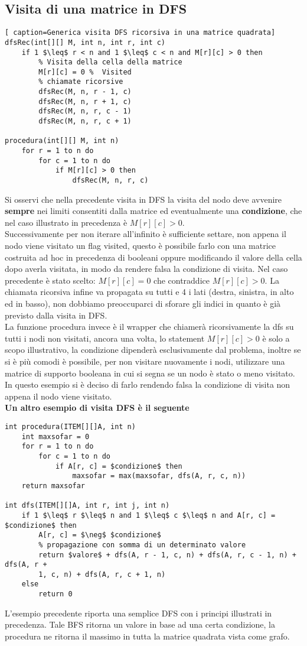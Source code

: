 \documentclass[../cheatSheetAlgoritmi.tex]{subfiles}
\begin{document}
\subsection{Visita di una matrice in DFS}
\begin{lstlisting}[ caption=Generica visita DFS ricorsiva in una matrice quadrata]
dfsRec(int[][] M, int n, int r, int c)
	if 1 $\leq$ r < n and 1 $\leq$ c < n and M[r][c] > 0 then
    	% Visita della cella della matrice
    	M[r][c] = 0	%  Visited
    	% chiamate ricorsive
    	dfsRec(M, n, r - 1, c)
    	dfsRec(M, n, r + 1, c)
    	dfsRec(M, n, r, c - 1)
    	dfsRec(M, n, r, c + 1)

procedura(int[][] M, int n)
	for r = 1 to n do
    	for c = 1 to n do
      		if M[r][c] > 0 then
        		dfsRec(M, n, r, c)
\end{lstlisting}
Si osservi che nella precedente visita in DFS la visita del nodo deve avvenire \textbf{sempre} nei limiti consentiti dalla matrice ed eventualmente una \textbf{condizione}, che nel caso illustrato in precedenza è $M[r][c] > 0$. \\
Successivamente per non iterare all'infinito è sufficiente settare, non appena il nodo viene visitato un flag visited, questo è possibile farlo con una matrice costruita ad hoc in precedenza di booleani oppure modificando il valore della cella dopo averla visitata, in modo da rendere falsa la condizione di visita. Nel caso precedente è stato scelto: $M[r][c] = 0$ che contraddice $M[r][c] > 0$. La chiamata ricorsiva infine va propagata su tutti e 4 i lati (destra, sinistra, in alto ed in basso), non dobbiamo preoccuparci di sforare gli indici in quanto è già previsto dalla visita in DFS.\\
La funzione procedura invece è il wrapper che chiamerà ricorsivamente la dfs su tutti i nodi non visitati, ancora una volta, lo statement $M[r][c] > 0$ è solo a scopo illustrativo, la condizione dipenderà esclusivamente dal problema, inoltre se si è più comodi è possibile, per non visitare nuovamente i nodi, utilizzare una matrice di supporto booleana in cui si segna se un nodo è stato o meno visitato. In questo esempio si è deciso di farlo rendendo falsa la condizione di visita non appena il nodo viene visitato.\\
\textbf{Un altro esempio di visita DFS è il seguente}
\begin{lstlisting}[caption=DFS generica con return di valore]
% esempio tenere il valore massimo
int procedura(ITEM[][]A, int n)
	int maxsofar = 0
  	for r = 1 to n do
    	for c = 1 to n do
      		if A[r, c] = $condizione$ then
       	 		maxsofar = max(maxsofar, dfs(A, r, c, n))
  	return maxsofar

int dfs(ITEM[][]A, int r, int j, int n)
	if 1 $\leq$ r $\leq$ n and 1 $\leq$ c $\leq$ n and A[r, c] = $condizione$ then
    	A[r, c] = $\neg$ $condizione$
    	% propagazione con somma di un determinato valore
    	return $valore$ + dfs(A, r - 1, c, n) + dfs(A, r, c - 1, n) + dfs(A, r +
  		1, c, n) + dfs(A, r, c + 1, n)
  	else
    	return 0
\end{lstlisting}
L'esempio precedente riporta una semplice DFS con i principi illustrati in precedenza. Tale BFS ritorna un valore in base ad una certa condizione, la procedura ne ritorna il massimo in tutta la matrice quadrata vista come grafo.
\newpage
\end{document}

